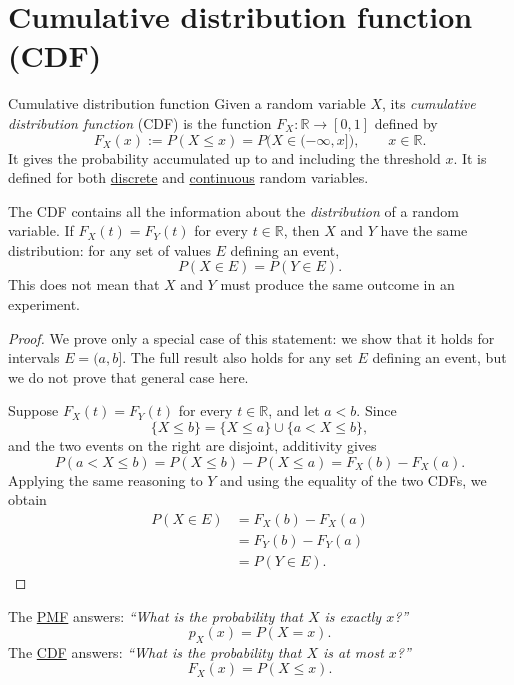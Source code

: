 \documentclass[a4paper,12pt,oneside]{report}
\begin{document}
\clearpage
\section{Cumulative distribution function (CDF)}

\begin{frameddefn}{Cumulative distribution function}
\label{def:cdf}
Given a random variable $X$, its \emph{cumulative distribution
function} (CDF) is the function $F_X:\mathbb R\to[0,1]$ defined by
\[
  F_X(x):=P(X\leq x)=P\bigl(X\in(-\infty,x]\bigr),
  \qquad x\in\mathbb R.
\]
It gives the probability accumulated up to and including the
threshold $x$. It is defined for both
\hyperref[def:discrete-pmf]{discrete} and
\hyperref[def:continuous-pdf]{continuous} random variables.
\end{frameddefn}

\begin{tcolorbox}[notesbox,colframe=red!45,colback=red!3,boxed title style={colback=red!25,colframe=red!45},title={Proposition: The CDF determines the distribution}]
The CDF contains all the information about the \emph{distribution}
of a random variable. If $F_X(t)=F_Y(t)$ for every $t\in\mathbb R$,
then $X$ and $Y$ have the same distribution: for any set of values
$E$ defining an event,
\[
  P(X\in E)=P(Y\in E).
\]
This does not mean that $X$ and $Y$ must produce the same outcome
in an experiment.
\end{tcolorbox}

\begin{proof}
We prove only a special case of this statement: we show that it
holds for intervals $E=(a,b]$. The full result also holds for any
set $E$ defining an event, but we do not prove that general case here.

Suppose $F_X(t)=F_Y(t)$ for every $t\in\mathbb R$, and let $a<b$.
Since
\[
  \{X\leq b\}=\{X\leq a\}\cup\{a<X\leq b\},
\]
and the two events on the right are disjoint, additivity gives
\[
  P(a<X\leq b)=P(X\leq b)-P(X\leq a)=F_X(b)-F_X(a).
\]
Applying the same reasoning to $Y$ and using the equality of the
two CDFs, we obtain
\[
  \begin{aligned}
    P(X\in E)&=F_X(b)-F_X(a)\\
              &=F_Y(b)-F_Y(a)\\
              &=P(Y\in E).
  \end{aligned}
\]
\end{proof}

\begin{notebox}
The \hyperref[def:discrete-pmf]{PMF} answers:
\emph{``What is the probability that $X$ is exactly $x$?''}
\[
  p_X(x)=P(X=x).
\]
The \hyperref[def:cdf]{CDF} answers:
\emph{``What is the probability that $X$ is at most $x$?''}
\[
  F_X(x)=P(X\leq x).
\]
\end{notebox}
\end{document}
